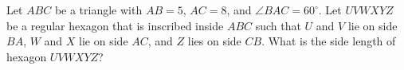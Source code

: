 Let $ABC$ be a triangle with $AB=5$, $AC=8$, and $\angle BAC=60^\circ$.  Let $UVWXYZ$ be a regular hexagon that is inscribed inside $ABC$ such that $U$ and $V$ lie on side $BA$, $W$ and $X$ lie on side $AC$, and $Z$ lies on side $CB$. What is the side length of hexagon $UVWXYZ$?

